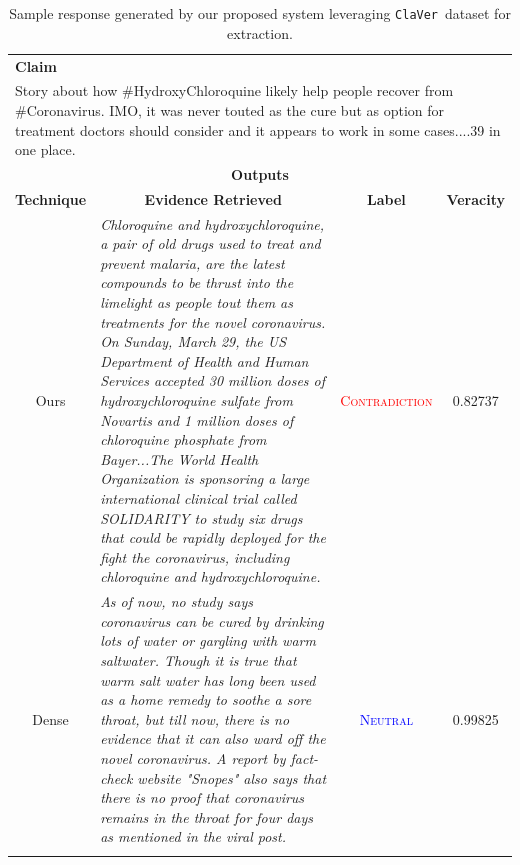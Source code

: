 \documentclass[11pt]{article}
\newcommand{\dataset}{\texttt{ClaVer}}
\begin{document}
\begin{table}[!t]
\centering
\caption{Sample response generated by our proposed system leveraging \dataset\ dataset for extraction.}
\resizebox{\textwidth}{!}
{
\begin{tabular}{c|p{25em}|c|c}
\hline  
    \multicolumn{1}{l}{\bf Claim} \\ 
    
    \multicolumn{4}{l}{\multirow{3}{45em}{Story about how \#HydroxyChloroquine likely help people recover from \#Coronavirus. IMO, it was never touted as the cure but as option for treatment doctors should consider and it appears to work in some cases....39 in one place.}} \\ 
    \multicolumn{4}{c}{} \\
    \multicolumn{4}{c}{} \\ \hline \hline
    \multicolumn{4}{c}{\bf Outputs} \\ \hline
    \bf Technique & \multicolumn{1}{|c|}{\bf Evidence Retrieved\footnotemark} & \bf Label & \bf Veracity \\ \hline
    Ours& \textit{Chloroquine and hydroxychloroquine, a pair of old drugs used to treat and prevent malaria, are the latest compounds to be thrust into the limelight as people tout them as treatments for the novel coronavirus. On Sunday, March 29, the US Department of Health and Human Services accepted 30 million doses of hydroxychloroquine sulfate from Novartis and 1 million doses of chloroquine phosphate from Bayer...The World Health Organization is sponsoring a large international clinical trial called SOLIDARITY to study six drugs that could be rapidly deployed for the fight the coronavirus, including chloroquine and hydroxychloroquine.} & \textcolor{red}{\textsc{Contradiction}} & 0.82737%
    \\ 
    \hdashline
    
    Dense & \textit{As of now, no study says coronavirus can be cured by drinking lots of water or gargling with warm saltwater. Though it is true that warm salt water has long been used as a home remedy to soothe a sore throat, but till now, there is no evidence that it can also ward off the novel coronavirus. A report by fact-check website "Snopes" also says that there is no proof that coronavirus remains in the throat for four days as mentioned in the viral post.} & \textcolor{blue}{\textsc{Neutral}} & 0.99825%
    \\ 
    \hdashline


\end{tabular}}
\end{table}
\end{document}
